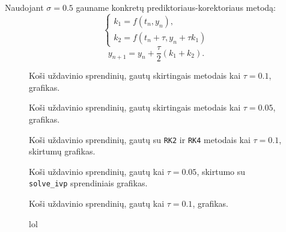 \documentclass[]{VUMIFTemplateClass}
\newcommand{\tone}{0.1}
\newcommand{\ttwo}{0.05}
\begin{document}
Naudojant $\sigma = 0.5$ gauname konkretų prediktoriaus-korektoriaus metodą:
\begin{equation}
    \begin{cases}
        k_1 = f(t_n, y_n),\\
        k_2 = f(t_n + \tau, y_n + \tau k_1)
    \end{cases}
\end{equation}
\[ y_{n+1} = y_n + \frac{\tau}{2} (k_1 + k_2). \]



\begin{figure}
    \begin{center}
        
    \end{center}
    \caption{Koši uždavinio sprendinių, gautų skirtingais metodais kai $\tau = \tone$, grafikas.}
\end{figure}
\begin{figure}
    \begin{center}
        
    \end{center}
    \caption{Koši uždavinio sprendinių, gautų skirtingais metodais kai $\tau = \ttwo$, grafikas.}
\end{figure}
\begin{figure}
    \begin{center}
        
    \end{center}
    \caption{Koši uždavinio sprendinių, gautų su \texttt{RK2} ir \texttt{RK4} metodais kai $\tau = \tone$, skirtumų grafikas.}
\end{figure}
\begin{figure}
    \begin{center}
        
    \end{center}
    \caption{Koši uždavinio sprendinių, gautų kai $\tau = \ttwo$, skirtumo su \texttt{solve\_ivp} sprendiniais grafikas.}
\end{figure}
\begin{figure}
    \begin{center}
        
    \end{center}
    \caption{Koši uždavinio sprendinių, gautų kai $\tau = \tone$, grafikas.}
\end{figure}
\begin{figure}
    \begin{center}
        
    \end{center}
    \caption{lol}
\end{figure}
\end{document}
